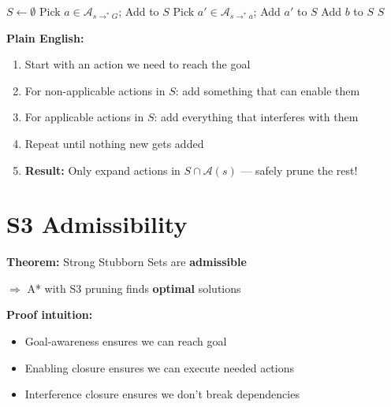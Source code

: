 \documentclass[11pt,a4paper]{article}
\begin{document}
\begin{examplebox}[S3 Algorithm]
\begin{algorithmic}
\STATE $S \gets \emptyset$ 
 
    \STATE Pick $a \in \mathcal{A}_{s \to^* G}$; Add to $S$ 
\ENDIF
{} 
        \STATE Pick $a' \in \mathcal{A}_{s \to^* a}$; Add $a'$ to $S$ 
    \ENDIF
        \STATE Add $b$ to $S$ 
    \ENDIF
\ENDWHILE
\RETURN $S$
\end{algorithmic}

\textbf{Plain English:}
\begin{enumerate}[leftmargin=*,nosep]
\item Start with an action we need to reach the goal
\item For non-applicable actions in $S$: add something that can enable them
\item For applicable actions in $S$: add everything that interferes with them
\item Repeat until nothing new gets added
\item \textbf{Result:} Only expand actions in $S \cap \mathcal{A}(s)$ --- safely prune the rest!
\end{enumerate}
\end{examplebox}

\section{S3 Admissibility}

\begin{definitionbox}
\textbf{Theorem:} Strong Stubborn Sets are \textbf{admissible}

$\Rightarrow$ A* with S3 pruning finds \textbf{optimal} solutions

\textbf{Proof intuition:}
\begin{itemize}[leftmargin=*,nosep]
\item Goal-awareness ensures we can reach goal
\item Enabling closure ensures we can execute needed actions
\item Interference closure ensures we don't break dependencies
\end{itemize}
\end{definitionbox}
\end{document}
